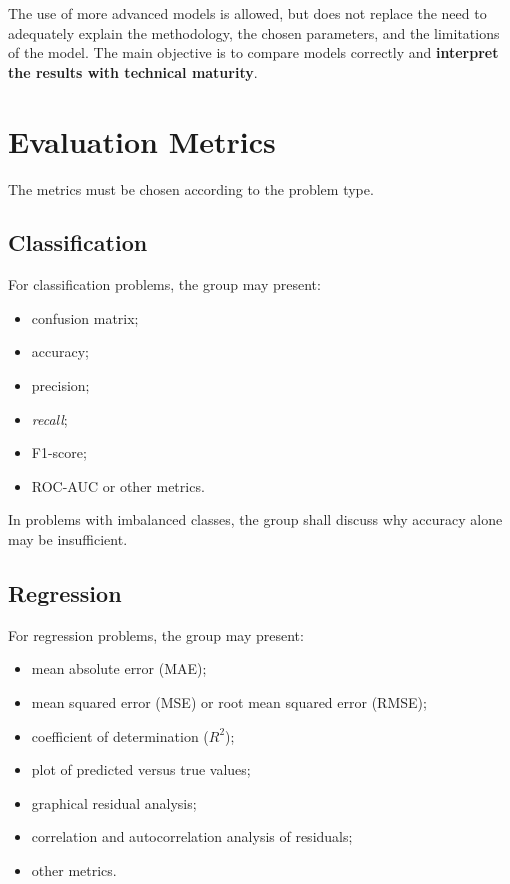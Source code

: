 \documentclass[a4paper]{ifacconf}
\begin{document}
The use of more advanced models is allowed, but does not replace the need to adequately explain the methodology, the chosen parameters, and the limitations of the model. The main objective is to compare models correctly and \textbf{interpret the results with technical maturity}.

\section{Evaluation Metrics}

The metrics must be chosen according to the problem type.

\subsection{Classification}

For classification problems, the group may present:
\begin{itemize}
    \item confusion matrix;
    \item accuracy;
    \item precision;
    \item \textit{recall};
    \item F1-score;
    \item ROC-AUC or other metrics.
\end{itemize}

In problems with imbalanced classes, the group shall discuss why accuracy alone may be insufficient.

\subsection{Regression}

For regression problems, the group may present:
\begin{itemize}
    \item mean absolute error (MAE);
    \item mean squared error (MSE) or root mean squared error (RMSE);
    \item coefficient of determination ($R^2$);
    \item plot of predicted versus true values;
    \item graphical residual analysis;
    \item correlation and autocorrelation analysis of residuals;
    \item other metrics.
\end{itemize}
\end{document}

